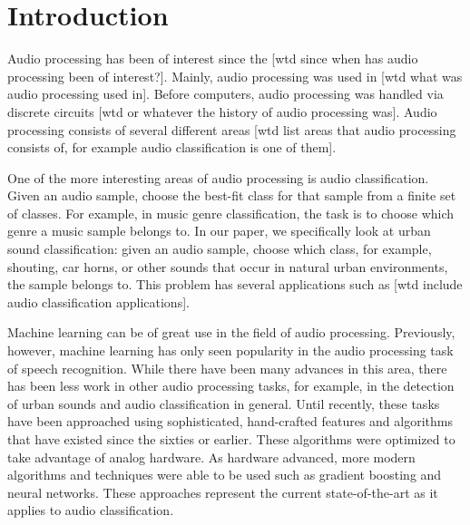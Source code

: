 \documentclass[a4paper,11pt,twoside]{scrbook}
\begin{document}
    \frontmatter
    \maketitle
    
    
    
    \tableofcontents
    \listoffigures

    \mainmatter

\chapter{Introduction}
\label{Introduction}

Audio processing has been of interest since the [wtd since when has audio processing been of interest?].  Mainly, audio processing was used in [wtd what was audio processing used in].  Before computers, audio processing was handled via discrete circuits [wtd or whatever the history of audio processing was].  Audio processing consists of several different areas [wtd list areas that audio processing consists of, for example audio classification is one of them].

One of the more interesting areas of audio processing is audio classification.  Given an audio sample, choose the best-fit class for that sample from a finite set of classes.  For example, in music genre classification, the task is to choose which genre a music sample belongs to.  In our paper, we specifically look at urban sound classification: given an audio sample, choose which class, for example, shouting, car horns, or other sounds that occur in natural urban environments, the sample belongs to.  This problem has several applications such as [wtd include audio classification applications].

Machine learning can be of great use in the field of audio processing.  Previously, however, machine learning has only seen popularity in the audio processing task of speech recognition.  While there have been many advances in this area, there has been less work in other audio processing tasks, for example, in the detection of urban sounds and audio classification in general.  Until recently, these tasks have been approached using sophisticated, hand-crafted features and algorithms that have existed since the sixties or earlier.  These algorithms were optimized to take advantage of analog hardware.  As hardware advanced, more modern algorithms and techniques were able to be used such as gradient boosting and neural networks.  These approaches represent the current state-of-the-art as it applies to audio classification.
\end{document}
